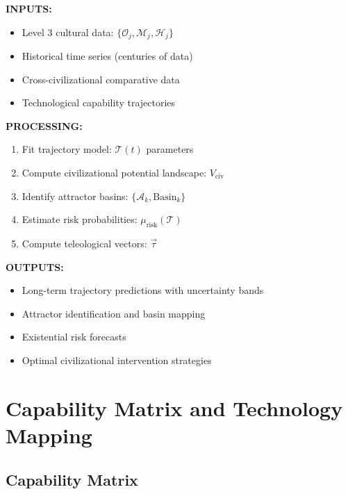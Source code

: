 \documentclass[11pt,twoside]{book}
\newcommand{\Overton}{\mathcal{O}}
\newcommand{\Memetic}{\mathcal{M}}
\newcommand{\Hyperstition}{\mathcal{H}}
\newcommand{\Trajectory}{\mathcal{T}}
\begin{document}
\begin{tcolorbox}[colback=blue!5!white,colframe=blue!65!black,title=\textbf{Level 4 I/O Specification}]
\textbf{INPUTS:}
\begin{itemize}
    \item Level 3 cultural data: $\{\Overton_j, \Memetic_j, \Hyperstition_j\}$
    \item Historical time series (centuries of data)
    \item Cross-civilizational comparative data
    \item Technological capability trajectories
\end{itemize}

\textbf{PROCESSING:}
\begin{enumerate}
    \item Fit trajectory model: $\Trajectory(t)$ parameters
    \item Compute civilizational potential landscape: $V_{\mathrm{civ}}$
    \item Identify attractor basins: $\{\mathcal{A}_k, \mathrm{Basin}_k\}$
    \item Estimate risk probabilities: $\mu_{\mathrm{risk}}(\Trajectory)$
    \item Compute teleological vectors: $\vec{\tau}$
\end{enumerate}

\textbf{OUTPUTS:}
\begin{itemize}
    \item Long-term trajectory predictions with uncertainty bands
    \item Attractor identification and basin mapping
    \item Existential risk forecasts
    \item Optimal civilizational intervention strategies
\end{itemize}
\end{tcolorbox}

\part{Capability Matrix and Technology Mapping}

\chapter{Capability Matrix}
\label{ch:capability-matrix}
\end{document}
